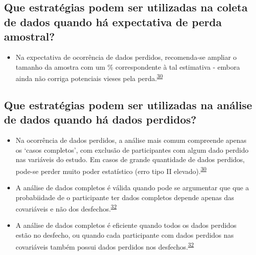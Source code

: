 \documentclass[
]{book}
\providecommand{\tightlist}{%
  \setlength{\itemsep}{0pt}\setlength{\parskip}{0pt}}
\begin{document}
\hypertarget{que-estratuxe9gias-podem-ser-utilizadas-na-coleta-de-dados-quando-huxe1-expectativa-de-perda-amostral}{%
\subsection{Que estratégias podem ser utilizadas na coleta de dados quando há expectativa de perda amostral?}\label{que-estratuxe9gias-podem-ser-utilizadas-na-coleta-de-dados-quando-huxe1-expectativa-de-perda-amostral}}

\begin{itemize}
\tightlist
\item
  Na expectativa de ocorrência de dados perdidos, recomenda-se ampliar o tamanho da amostra com um \% correspondente à tal estimativa - embora ainda não corriga potenciais vieses pela perda.\textsuperscript{\protect\hyperlink{ref-Altman2007}{30}}
\end{itemize}

\hypertarget{que-estratuxe9gias-podem-ser-utilizadas-na-anuxe1lise-de-dados-quando-huxe1-dados-perdidos}{%
\subsection{Que estratégias podem ser utilizadas na análise de dados quando há dados perdidos?}\label{que-estratuxe9gias-podem-ser-utilizadas-na-anuxe1lise-de-dados-quando-huxe1-dados-perdidos}}

\begin{itemize}
\item
  Na ocorrência de dados perdidos, a análise mais comum compreende apenas os `casos completos', com exclusão de participantes com algum dado perdido nas variáveis do estudo. Em casos de grande quantidade de dados perdidos, pode-se perder muito poder estatístico (erro tipo II elevado).\textsuperscript{\protect\hyperlink{ref-Altman2007}{30}}
\item
  A análise de dados completos é válida quando pode se argumentar que que a probabiidade de o participante ter dados completos depende apenas das covariáveis e não dos desfechos.\textsuperscript{\protect\hyperlink{ref-carpenter2021}{32}}
\item
  A análise de dados completos é eficiente quando todos os dados perdidos estão no desfecho, ou quando cada participante com dados perdidos nas covariáveis também possui dados perdidos nos desfechos.\textsuperscript{\protect\hyperlink{ref-carpenter2021}{32}}
\end{itemize}
\end{document}
